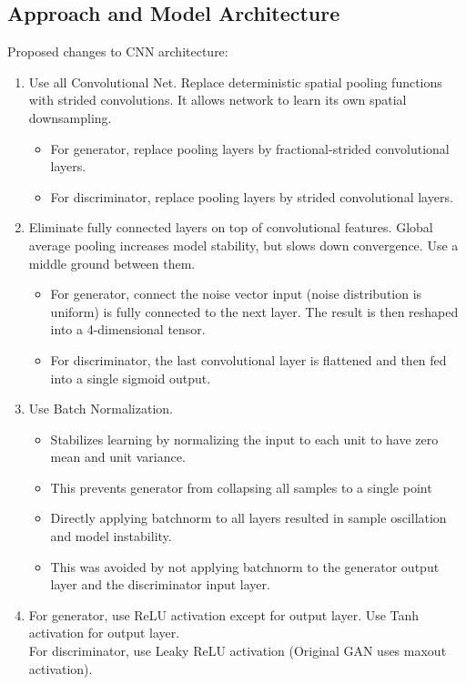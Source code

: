 \documentclass{article}
\begin{document}
    \subsection{Approach and Model Architecture}\label{subsec:Unsupervised_Representation_Learning_with_Deep_Convolutional_Generative_Adversarial_Networks_(DC_GAN):model-architecture}
    Proposed changes to CNN architecture:
    \begin{enumerate}
        \item Use all Convolutional Net.
        Replace deterministic spatial pooling functions with strided convolutions.
        It allows network to learn its own spatial downsampling.
        \begin{itemize}
            \item For generator, replace pooling layers by fractional-strided convolutional layers.
            \item For discriminator, replace pooling layers by strided convolutional layers.
        \end{itemize}
        \item Eliminate fully connected layers on top of convolutional features.
        Global average pooling increases model stability, but slows down convergence.
        Use a middle ground between them.
        \begin{itemize}
            \item For generator, connect the noise vector input (noise distribution is uniform) is fully connected to the next layer.
            The result is then reshaped into a 4-dimensional tensor.
            \item For discriminator, the last convolutional layer is flattened and then fed into a single sigmoid output.
        \end{itemize}
        \item Use Batch Normalization.
        \begin{itemize}
            \item Stabilizes learning by normalizing the input to each unit to have zero mean and unit variance.
            \item This prevents generator from collapsing all samples to a single point
            \item Directly applying batchnorm to all layers resulted in sample oscillation and model instability.
            \item This was avoided by not applying batchnorm to the generator output layer and the discriminator input layer.
        \end{itemize}
        \item For generator, use ReLU activation except for output layer.
        Use Tanh activation for output layer. \\
        For discriminator, use Leaky ReLU activation (Original GAN uses maxout activation).
    \end{enumerate}
\end{document}
